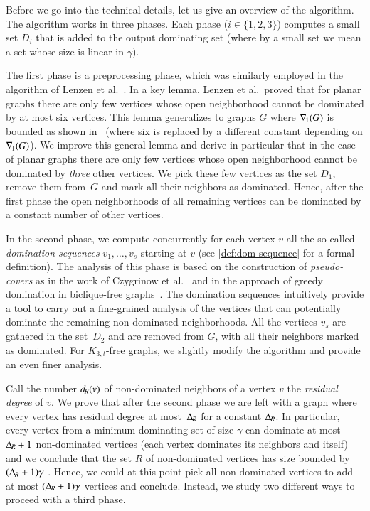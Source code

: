 \medskip
Before we go into the technical details, let us give an overview of the
algorithm. The algorithm works in three phases. Each phase ($i\in \{1,2,3\}$) computes a small set $D_i$ that is added to the output dominating set
(where by a  small set we mean a set whose size is linear in $\gamma$).


The first phase is a preprocessing phase, which was similarly employed in the
algorithm of Lenzen et al.~\cite{lenzen2013distributed}. In a key lemma,
Lenzen et al.\ proved that for planar graphs
there are only few vertices whose open neighborhood
cannot be dominated by at most six vertices. This lemma generalizes
to graphs $G$ where $\nabla_{\hspace{-1pt}1}(G)$ is bounded as
shown in~\cite{amiri2019distributed} (where six is replaced by a different constant depending
on $\nabla_{\hspace{-1pt}1}(G)$). We improve this general lemma and
derive in particular that in the case of planar graphs there are only few
vertices whose open neighborhood cannot be
dominated by \emph{three} other vertices.
We pick these few vertices as the set $D_1$,
remove them from~$G$ and mark all their neighbors as dominated.
Hence, after the first phase the open neighborhoods of all
remaining vertices can be dominated by a constant number of
other vertices.

In the second phase, %
we compute concurrently for each vertex $v$ all the so-called
\emph{domination sequences} $v_1,\ldots, v_s$ starting at $v$ (see
 \cref{def:dom-sequence} for a formal definition). The analysis of this phase is based
on the construction of
\emph{pseudo-covers} as in the work of Czygrinow et al.~\cite{czygrinow2018distributed} and in the approach of greedy domination
in biclique-free graphs~\cite{siebertz2019greedy}. The domination
sequences intuitively
provide a tool to carry out a fine-grained analysis of the vertices that
can potentially dominate the remaining non-dominated neighborhoods.
All the vertices $v_s$ are gathered in the set~$D_2$ and are removed from $G$, with all their neighbors marked as dominated. For $K_{3,t}$-free graphs, we slightly modify the
algorithm and provide an even finer analysis.

Call  the number  $d_{\hspace{-1pt}R}(v)$ of non-dominated neighbors of a vertex $v$
the \emph{residual degree} of $v$. We prove that
after the second phase we are left with a graph where every vertex
has residual degree at most~$\Delta_{\hspace{-1pt}R}$ for a constant $\Delta_{\hspace{-1pt}R}$. In particular, every vertex
from a minimum dominating set of size $\gamma$ can dominate at most $\Delta_{\hspace{-1pt}R}+1$
non-dominated vertices (each
vertex dominates its neighbors and itself) and we conclude that the set $R$
of non-dominated vertices has size bounded by~$(\Delta_{\hspace{-1pt}R}+1)\gamma$ . Hence, we could at this
point pick all non-dominated vertices to add at most $(\Delta_{\hspace{-1pt}R}+1)\gamma$ vertices
and conclude. Instead, we study two different ways to proceed with a third phase.


